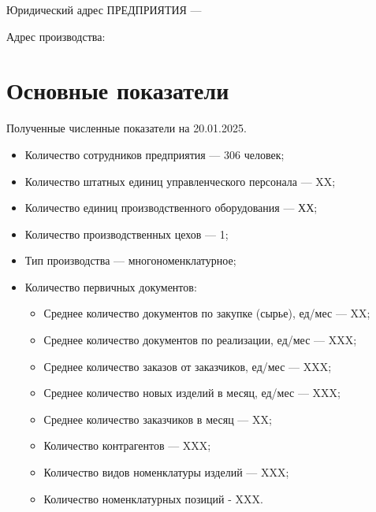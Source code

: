 Юридический адрес ПРЕДПРИЯТИЯ --- \CURADDRESS

Адрес производства: \ADDRESS



\section{Основные показатели}

Полученные численные показатели на 20.01.2025.

\begin{itemize}
\item Количество сотрудников предприятия --- 306 человек;

\item Количество штатных единиц управленческого персонала --- XX;
\item Количество единиц производственного оборудования --- ХХ;
\item Количество производственных цехов --- 1;
\item Тип производства --- многономенклатурное;

\item Количество первичных документов:
\begin{itemize}
\item Среднее количество документов по закупке (сырье), ед/мес — XX;
\item Среднее количество документов по реализации, ед/мес — XXX;
\item Среднее количество заказов от заказчиков, ед/мес — XXX;
\item Среднее количество новых изделий в месяц, ед/мес — XXX;
\item Среднее количество заказчиков в месяц — XX;
\item Количество контрагентов — XXX;
\item Количество видов номенклатуры изделий — XXX;
\item Количество номенклатурных позиций - XXX.


\end{itemize}

\end{itemize}












% 